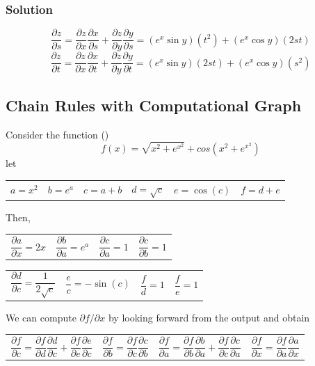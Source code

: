 \subsubsection{Solution}
$$
    \frac{\partial z}{\partial s}=\frac{\partial z}{\partial x}\frac{\partial x}{\partial s} + \frac{\partial z}{\partial y}\frac{\partial y}{\partial s} = (e^x \sin y)(t^2) + (e^x \cos y)(2st)
$$
$$
    \frac{\partial z}{\partial t}=\frac{\partial z}{\partial x}\frac{\partial x}{\partial t} + \frac{\partial z}{\partial y}\frac{\partial y}{\partial t} = (e^x \sin y)(2st) + (e^x \cos y)(s^2)
$$

\subsection{Chain Rules with Computational Graph}
Consider the function (\cite{mml-book})
\begin{equation}
    f(x) = \sqrt{x^2 + e^{x^2}} + cos(x^2 + e^{x^2})
\end{equation}
let

\begin{tabularx}{\linewidth}{@{}XX@{}XX@{}XX@{}}
    $
        a = x^2
    $
    &
    $
        b = e^a
    $
    &
    $
        c = a + b
    $
    &
    $
        d = \sqrt{c}
    $
    &
    $
        e = \cos (c)
    $ 
    &
    $
        f = d + e
    $
\end{tabularx}
Then,

\noindent
\begin{tabularx}{\linewidth}{@{}XX@{}XX@{}}
    $$
        \frac{\partial a}{\partial x} = 2x
    $$
    &
    $$
        \frac{\partial b}{\partial a} = e^a
    $$
    &
    $$
        \frac{\partial c}{\partial a} = 1
    $$
    &
    $$
        \frac{\partial c}{\partial b} = 1
    $$
\end{tabularx}

\begin{tabularx}{\linewidth}{@{}XX@{}XX@{}}
    $$
        \frac{\partial d}{\partial c} = \frac{1}{2\sqrt{c}}
    $$ 
    &
    $$
        \frac{e}{c} = -\sin (c)
    $$
    &
    $$
        \frac{f}{d} = 1
    $$
    &
    $$
        \frac{f}{e} = 1
    $$
\end{tabularx}

We can compute $\partial f / \partial x$ by looking forward from the output and obtain

\noindent
\begin{tabularx}{\linewidth}{@{}XX@{}XX@{}}
    $$
        \frac{\partial f}{\partial c} = \frac{\partial f}{\partial d}\frac{\partial d}{\partial c} + \frac{\partial f}{\partial e}\frac{\partial e}{\partial c}
    $$
    &
    $$
        \frac{\partial f}{\partial b} = \frac{\partial f}{\partial c}\frac{\partial c}{\partial b}
    $$
    &
    $$
        \frac{\partial f}{\partial a} = \frac{\partial f}{\partial b}\frac{\partial b}{\partial a} + \frac{\partial f}{\partial c}\frac{\partial c}{\partial a}
    $$
    &
    $$
        \frac{\partial f}{\partial x} = \frac{\partial f}{\partial a}\frac{\partial a}{\partial x}
    $$
\end{tabularx}

